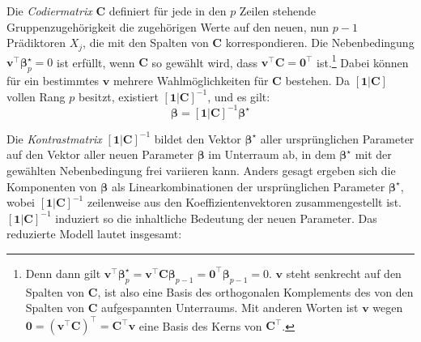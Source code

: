 Die \emph{Codiermatrix} $\bm{C}$ definiert für jede in den $p$ Zeilen stehende Gruppenzugehörigkeit die zugehörigen Werte auf den neuen, nun $p-1$ Prädiktoren $X_{j}$, die mit den Spalten von $\bm{C}$ korrespondieren. Die Nebenbedingung $\bm{v}^{\top} \bm{\beta}_{p}^{\star} = 0$ ist erfüllt, wenn $\bm{C}$ so gewählt wird, dass $\bm{v}^{\top} \bm{C} = \bm{0}^{\top}$ ist.\footnote{Denn dann gilt $\bm{v}^{\top} \bm{\beta}_{p}^{\star} = \bm{v}^{\top} \bm{C} \bm{\beta}_{p-1} = \bm{0}^{\top} \bm{\beta}_{p-1} = 0$. $\bm{v}$ steht senkrecht auf den Spalten von $\bm{C}$, ist also eine Basis des orthogonalen Komplements des von den Spalten von $\bm{C}$ aufgespannten Unterraums. Mit anderen Worten ist $\bm{v}$ wegen $\bm{0} = (\bm{v}^{\top} \bm{C})^{\top} = \bm{C}^{\top} \bm{v}$ eine Basis des Kerns von $\bm{C}^{\top}$.} Dabei können für ein bestimmtes $\bm{v}$ mehrere Wahlmöglichkeiten für $\bm{C}$ bestehen. Da $[\bm{1} | \bm{C}]$ vollen Rang $p$ besitzt, existiert $[\bm{1} | \bm{C}]^{-1}$, und es gilt:
\begin{equation*}
\bm{\beta} = [\bm{1} | \bm{C}]^{-1} \bm{\beta}^{\star}
\end{equation*}

Die \emph{Kontrastmatrix} $[\bm{1} | \bm{C}]^{-1}$ bildet den Vektor $\bm{\beta}^{\star}$ aller ursprünglichen Parameter auf den Vektor aller neuen Parameter $\bm{\beta}$ im Unterraum ab, in dem $\bm{\beta}^{\star}$ mit der gewählten Nebenbedingung frei variieren kann. Anders gesagt ergeben sich die Komponenten von $\bm{\beta}$ als Linearkombinationen der ursprünglichen Parameter $\bm{\beta}^{\star}$, wobei $[\bm{1} | \bm{C}]^{-1}$ zeilenweise aus den Koeffizientenvektoren zusammengestellt ist. $[\bm{1} | \bm{C}]^{-1}$ induziert so die inhaltliche Bedeutung der neuen Parameter. Das reduzierte Modell lautet insgesamt:

